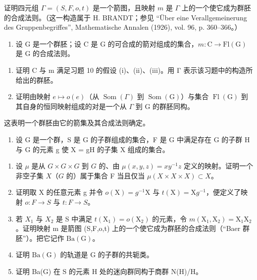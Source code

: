 证明四元组 \(\Gamma = (S, F, o, t)\) 是一个箭图，且映射 \(m\) 是 \(\Gamma\) 上的一个使它成为群胚的合成法则。（这一构造属于 H. BRANDT；参见 “Über eine Verallgemeinerung des Gruppenbegriffes”, Mathematische Annalen (1926), vol. 96, p. 360–366。）

\begin{enumerate}
\def\labelenumi{\arabic{enumi})}
\setcounter{enumi}{10}
\tightlist
\item
  设 G 是一个群胚；设 C 是 G 的可合成的箭对组成的集合，\(m\colon\mathrm{C}\to\mathrm{Fl}(\mathrm{G})\) 是 G 的合成法则。
\end{enumerate}

\begin{enumerate}
\def\labelenumi{\alph{enumi})}
\item
  证明 C 与 m 满足习题 10 的假设 (i)、(ii)、(iii)。用 Γ 表示该习题中的构造所给出的群胚。
\item
  证明由映射 \(e \mapsto o(e)\)（从 \(\operatorname{Som}(\Gamma)\) 到 \(\operatorname{Som}(\mathrm{G})\)）与集合 \(\operatorname{Fl}(\mathrm{G})\) 到其自身的恒同映射组成的对是一个从 \(\Gamma\) 到 G 的群胚同构。
\end{enumerate}

这表明一个群胚由它的箭集及其合成法则确定。

\begin{enumerate}
\def\labelenumi{\arabic{enumi})}
\setcounter{enumi}{11}
\tightlist
\item
  设 G 是一个群，S 是 G 的子群组成的集合，F 是 G 中满足存在 G 的子群 H 与 G 的元素 g 使 X = gH 的子集 X 组成的集合。
\end{enumerate}

\begin{enumerate}
\def\labelenumi{\alph{enumi})}
\item
  设 \(\mu\) 是从 \(G \times G \times G\) 到 \(G\) 的、由 \(\mu(x,y,z)=xy^{-1}z\) 定义的映射。证明一个非空子集 \(X\)（\(G\) 的）属于集合 F 当且仅当 \(\mu(X\times X\times X)\subset X\)。
\item
  证明取 X 的任意元素 g 并令 \(o(\mathrm{X}) = g^{-1}\mathrm{X}\) 与 \(t(\mathrm{X}) = \mathrm{X}g^{-1}\)，便定义了映射 \(o: F \to S\) 与 \(t: F \to S\)。
\item
  若 \(X_{1}\) 与 \(X_{2}\) 是 S 中满足 \(t(\mathrm{X}_{1}) = o(\mathrm{X}_{2})\) 的元素，令 \(m(\mathrm{X}_{1}, \mathrm{X}_{2}) = \mathrm{X}_{1}\mathrm{X}_{2}\)。证明映射 m 是箭图 (S,F,o,t) 上的一个使它成为群胚的合成法则（“Baer 群胚”）。把它记作 \(\mathrm{Ba}(\mathrm{G})\)。
\item
  证明 \(\mathrm{Ba}(\mathrm{G})\) 的轨道是 G 的子群的共轭类。
\item
  证明 Ba(G) 在 S 的元素 H 处的迷向群同构于商群 N(H)/H。
\end{enumerate}

\setcounter{exercisegroup}{4}

